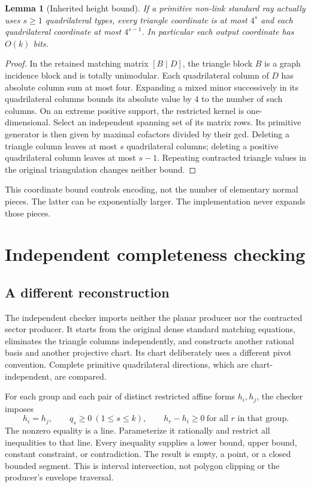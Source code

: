 \documentclass[11pt,letterpaper]{article}
\newtheorem{lemma}[theorem]{Lemma}
\theoremstyle{definition}
\theoremstyle{remark}\newtheorem{remark}[theorem]{Remark}
\begin{document}
\begin{lemma}[Inherited height bound]
\label{lem:height}
If a primitive non-link standard ray actually uses $s\ge1$ quadrilateral
types, every triangle coordinate is at most $4^s$ and each quadrilateral
coordinate at most $4^{s-1}$. In particular each output coordinate has
$O(k)$ bits.
\end{lemma}

\begin{proof}
In the retained matching matrix $[B\mid D]$, the triangle block $B$ is
a graph incidence block and is totally unimodular. Each quadrilateral
column of $D$ has absolute column sum at most four. Expanding a mixed
minor successively in its quadrilateral columns bounds its absolute value
by $4$ to the number of such columns. On an extreme positive support,
the restricted kernel is one-dimensional. Select an independent spanning
set of its matrix rows. Its primitive generator is then given by maximal
cofactors divided by their gcd. Deleting a triangle
column leaves at most $s$ quadrilateral columns; deleting a positive
quadrilateral column leaves at most $s-1$. Repeating contracted triangle
values in the original triangulation changes neither bound.
\end{proof}

This coordinate bound controls encoding, not the number of elementary
normal pieces. The latter can be exponentially larger. The implementation
never expands those pieces.

\section{Independent completeness checking}
\label{sec:verification}

\subsection{A different reconstruction}

The independent checker imports neither the planar producer nor the
contracted sector producer. It starts from the original dense standard
matching equations, eliminates the triangle columns independently, and
constructs another rational basis and another projective chart. Its chart
deliberately uses a different pivot convention. Complete primitive
quadrilateral directions, which are chart-independent, are compared.

For each group and each pair of distinct restricted affine forms $h_i,h_j$,
the checker imposes
\begin{equation}
 h_i=h_j,\qquad q_s\ge0\ (1\le s\le k),\qquad
 h_r-h_i\ge0\ \text{for all }r\text{ in that group}.
 \label{eq:tie}
\end{equation}
The nonzero equality is a line. Parameterize it rationally and restrict
all inequalities to that line. Every inequality supplies a lower bound,
upper bound, constant constraint, or contradiction. The result is empty,
a point, or a closed bounded segment. This is interval intersection, not
polygon clipping or the producer's envelope traversal.
\end{document}
